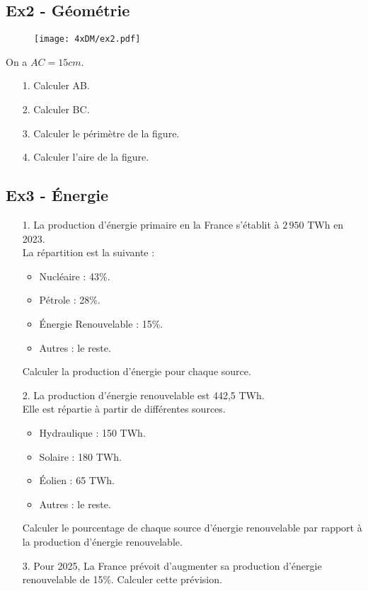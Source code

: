 \begin{multicols}{2}\noindent

\subsection*{Ex2 - Géométrie}

\begin{figure}[H]
  \centering
  \texttt{[image: 4xDM/ex2.pdf]}
\end{figure}

On a $AC = 15cm$.

\begin{enumerate}
  \item[1.] Calculer AB.
  \item[2.] Calculer BC.
  \item[3.] Calculer le périmètre de la figure.
  \item[4.] Calculer l'aire de la figure. 
\end{enumerate} \columnbreak

\subsection*{Ex3 - Énergie}

\begin{enumerate}
  \item[1.] La production d’énergie primaire en la France s’établit à $2 \, 950$ TWh en 2023. \\
  La répartition est la suivante : 

  \begin{itemize}[label={$\bullet$}]
    \item Nucléaire : 43\%. 
    \item Pétrole : 28\%. 
    \item Énergie Renouvelable : 15\%. 
    \item Autres : le reste.
  \end{itemize} 
  Calculer la production d'énergie pour chaque source. 

  \item[2.] La production d'énergie renouvelable est 442,5 TWh. \\
  Elle est répartie à partir de différentes sources.

  \begin{itemize}[label={$\bullet$}]
    \item Hydraulique : 150 TWh. 
    \item Solaire : 180 TWh. 
    \item Éolien : 65 TWh.
    \item Autres : le reste. 
  \end{itemize} 

  Calculer le pourcentage de chaque source d'énergie renouvelable par rapport à la production d'énergie renouvelable.

  \item[3.] Pour 2025, La France prévoit d'augmenter sa production d'énergie renouvelable de 15\%. Calculer cette prévision. 
\end{enumerate}

\end{multicols}


